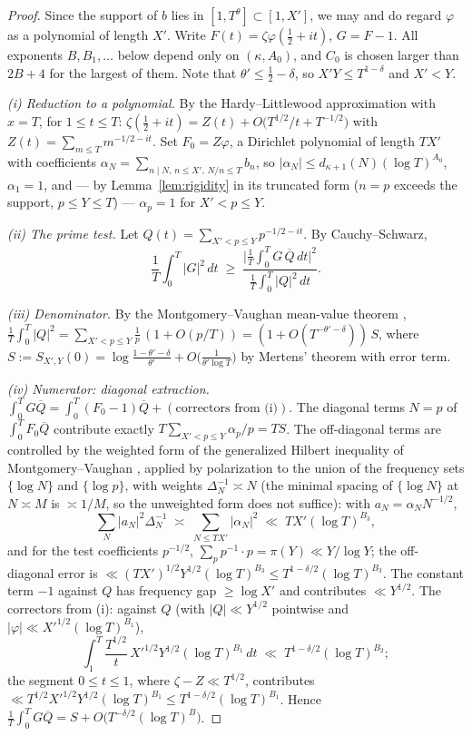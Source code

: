 \documentclass[11pt]{amsart}
\theoremstyle{plain}
\theoremstyle{definition}
\theoremstyle{remark}
\begin{document}
\begin{proof}
Since the support of $b$ lies in $[1,T^\theta]\subset[1,X']$, we may and do regard $\varphi$ as a polynomial of length $X'$. Write $F(t)=\zeta\varphi(\tfrac12+it)$, $G=F-1$. All exponents $B,B_1,\dots$ below depend only on $(\kappa,A_0)$, and $C_0$ is chosen larger than $2B+4$ for the largest of them. Note that $\theta'\le\tfrac12-\delta$, so $X'Y\le T^{1-\delta}$ and $X'<Y$.

\emph{(i) Reduction to a polynomial.} By the Hardy--Littlewood approximation \cite[Thm 4.11]{Titchmarsh1986} with $x=T$, for $1\le t\le T$: $\zeta(\tfrac12+it)=Z(t)+O\bigl(T^{1/2}/t+T^{-1/2}\bigr)$ with $Z(t)=\sum_{m\le T}m^{-1/2-it}$. Set $F_0=Z\varphi$, a Dirichlet polynomial of length $TX'$ with coefficients $\alpha_N=\sum_{n\mid N,\,n\le X',\,N/n\le T}b_n$, so $|\alpha_N|\le d_{\kappa+1}(N)(\log T)^{A_0}$, $\alpha_1=1$, and --- by Lemma~\ref{lem:rigidity} in its truncated form ($n=p$ exceeds the support, $p\le Y\le T$) --- $\alpha_p=1$ for $X'<p\le Y$.

\emph{(ii) The prime test.} Let $Q(t)=\sum_{X'<p\le Y}p^{-1/2-it}$. By Cauchy--Schwarz,
\[
\frac1T\int_0^T|G|^2\,dt\;\ge\;\frac{\bigl|\frac1T\int_0^TG\,\overline Q\,dt\bigr|^2}{\frac1T\int_0^T|Q|^2\,dt}.
\]

\emph{(iii) Denominator.} By the Montgomery--Vaughan mean-value theorem \cite{MontgomeryVaughan1974}, $\frac1T\int_0^T|Q|^2=\sum_{X'<p\le Y}\frac1p\,(1+O(p/T))=(1+O(T^{-\theta'-\delta}))\,S$, where $S:=S_{X',Y}(0)=\log\frac{1-\theta'-\delta}{\theta'}+O\bigl(\frac1{\theta'\log T}\bigr)$ by Mertens' theorem with error term.

\emph{(iv) Numerator: diagonal extraction.} $\int_0^TG\overline Q=\int_0^T(F_0-1)\overline Q+(\text{correctors from (i)})$. The diagonal terms $N=p$ of $\int_0^T F_0\overline Q$ contribute exactly $T\sum_{X'<p\le Y}\alpha_p/p=TS$. The off-diagonal terms are controlled by the weighted form of the generalized Hilbert inequality of Montgomery--Vaughan \cite{MontgomeryVaughan1974}, applied by polarization to the union of the frequency sets $\{\log N\}$ and $\{\log p\}$, with weights $\Delta_N^{-1}\asymp N$ (the minimal spacing of $\{\log N\}$ at $N\asymp M$ is $\asymp1/M$, so the unweighted form does not suffice): with $a_N=\alpha_NN^{-1/2}$,
\[
\sum_N|a_N|^2\Delta_N^{-1}\;\asymp\;\sum_{N\le TX'}|\alpha_N|^2\;\ll\;TX'(\log T)^{B_3},
\]
and for the test coefficients $p^{-1/2}$, $\sum_p p^{-1}\cdot p=\pi(Y)\ll Y/\log Y$; the off-diagonal error is $\ll(TX')^{1/2}Y^{1/2}(\log T)^{B_3}\le T^{1-\delta/2}(\log T)^{B_3}$. The constant term $-1$ against $Q$ has frequency gap $\ge\log X'$ and contributes $\ll Y^{1/2}$. The correctors from (i): against $Q$ (with $|Q|\ll Y^{1/2}$ pointwise and $|\varphi|\ll X'^{1/2}(\log T)^{B_1}$),
\[
\int_1^T\frac{T^{1/2}}{t}\,X'^{1/2}Y^{1/2}(\log T)^{B_1}\,dt\;\ll\;T^{1-\delta/2}(\log T)^{B_2};
\]
the segment $0\le t\le1$, where $\zeta-Z\ll T^{1/2}$, contributes $\ll T^{1/2}X'^{1/2}Y^{1/2}(\log T)^{B_1}\le T^{1-\delta/2}(\log T)^{B_1}$. Hence $\frac1T\int_0^TG\overline Q=S+O\bigl(T^{-\delta/2}(\log T)^{B}\bigr)$.


\end{proof}
\end{document}
